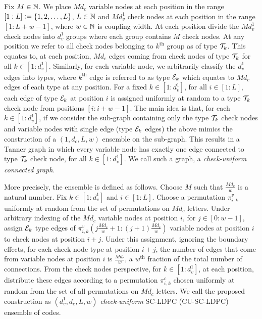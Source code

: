 Fix $M\in \mathbb{N}$. We place $M d_{c}$ variable nodes at each position in the range $[1: L]\mathrel{\mathop:}=\{1,2,\ldots ,L\}$, $L\in\mathbb{N}$ and $Md_{v}^{1}$ check nodes at each position in the range $[1 : L+w-1]$, where $w\in \mathbb{N}$ is coupling width. At each position divide the $Md_{v}^{1}$ check nodes into $d_{v}^{1}$ groups where each group contains $M$ check nodes. At any position we refer to all check nodes belonging to $k^{\text{th}}$ group as of type $\mathcal{T}_{k}$. This equates to, at each position,  $Md_{c}$ edges coming from check nodes of type $\mathcal{T}_{k}$ for all $k\in [1:d_{v}^{1}]$. Similarly, for each variable node, we arbitrarily classify the $d_{v}^{1}$ edges into types, where $k^{\text{th}}$ edge is referred to as type $\mathcal{E}_{k}$ which equates to $Md_{c}$ edges of each type at any position. For a fixed $k \in [1 : d_{v}^{1}]$, for all $i \in [1 : L]$, each edge of type $\mathcal{E}_{k}$ at position $i$ is assigned uniformly at random to a type $\mathcal{T}_{k}$ check node from positions $[i : i+w-1]$. The main idea is that, for each $k\in [1:d_{v}^{1}]$, if we consider the sub-graph containing only the type $\mathcal{T}_{k}$ check nodes and variable nodes with single edge (type $\mathcal{E}_{k}$ edges) the above mimics the construction of a $(1,d_{c},L,w)$ ensemble \cite{KudekarUrbanke11} on the sub-graph. This results in a Tanner graph in which every variable node has exactly one edge connected to type $\mathcal{T}_{k}$ check node, for all $k \in [1: d_{v}^{1}]$. We call such a graph, a \textit{check-uniform connected graph}.

More precisely, the ensemble is defined as follows. Choose $M$ such that $\frac{Md_{c}}{w}$ is a natural number. Fix $k\in[1:d_{v}^{1}]$ and $i\in[1:L]$. Choose a permutation $\pi^{v}_{i,k}$ uniformly at random from the set of permutations on $Md_{c}$ letters. Under arbitrary indexing of the $Md_{c}$ variable nodes at position $i$, for $j\in [0:w-1]$, assign $\mathcal{E}_{k}$ type edges of $\pi^{v}_{i,k}\left(j\frac{Md_{c}}{w}+1:(j+1)\frac{Md_{c}}{w}\right)$ variable nodes at position $i$ to check nodes at position $i+j$. Under this assignment, ignoring the boundary effects, for each check node type at position $i+j$, the number of edges that come from variable nodes at position $i$ is $\frac{Md_{c}}{w}$, a $w^{\text{th}}$ fraction of the total number of connections. From the check nodes perspective, for $k\in[1:d_{v}^{1}]$, at  each position, distribute these edges according to a permutation $\pi^{c}_{i,k}$ chosen uniformly at random from the set of all permutations on $Md_{c}$ letters. We call the proposed construction as $(d_{v}^{1},d_{c},L,w)$ \textit{check-uniform} SC-LDPC (CU-SC-LDPC) ensemble of codes.  


